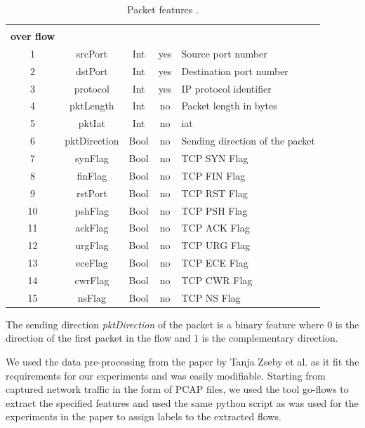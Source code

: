 \begin{table}[h]
	\centering
	\begin{tabular}{c c c c l}
		\thead{\textbf{\#}} & \thead{\textbf{Name}} & \thead{\textbf{Type}} & \thead{\textbf{Constant} \\ \textbf{over flow}} & \thead{\textbf{Description}} \\ \hline \midrule
		1 & srcPort & Int & yes & Source port number \\ \midrule
		2 & dstPort & Int & yes & Destination port number \\ \midrule
		3 & protocol & Int & yes & IP protocol identifier \\ \midrule
		4 & pktLength & Int & no & Packet length in bytes \\ \midrule
		5 & pktIat & Int & no & \gls{iat} \\ \midrule
		6 & pktDirection & Bool & no & Sending direction of the packet \\ \midrule
		7 & synFlag & Bool & no & TCP SYN Flag \\ \midrule
		8 & finFlag & Bool & no & TCP FIN Flag \\ \midrule
		9 & rstPort & Bool & no & TCP RST Flag \\ \midrule
		10 & pshFlag & Bool & no & TCP PSH Flag \\ \midrule
		11 & ackFlag & Bool & no & TCP ACK Flag \\ \midrule
		12 & urgFlag & Bool & no & TCP URG Flag \\ \midrule
		13 & eceFlag & Bool & no & TCP ECE Flag \\ \midrule
		14 & cwrFlag & Bool & no & TCP CWR Flag \\ \midrule
		15 & nsFlag & Bool & no & TCP NS Flag \\ \midrule
	\end{tabular}
	\caption{Packet features \cite{cic_ids_2017_analysis}.}
	\label{table:methodology:data_representation:features}
\end{table}

The sending direction \textit{pktDirection} of the packet is a binary feature where $0$ is the direction of the first packet in the flow and $1$ is the complementary direction. \par

We used the data pre-processing from the paper \cite{adversarial_recurrent_ids} by Tanja Zseby et al. as it fit the requirements for our experiments and was easily modifiable. Starting from captured network traffic in the form of PCAP files, we used the tool go-flows \cite{go_flows} to extract the specified features and used the same python script as was used for the experiments in the paper \cite{adversarial_recurrent_ids} to assign labels to the extracted flows. \par

